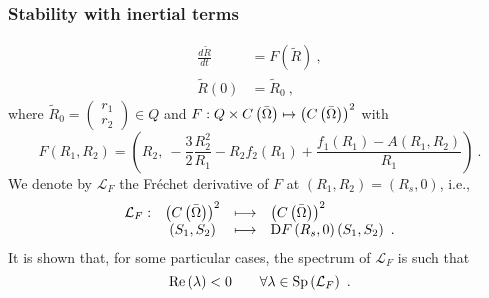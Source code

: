 \documentclass[10pt,aspectratio=169]{beamer}
\begin{document}
\begin{frame}
\frametitle{Stability with inertial terms}
\vspace*{0.5cm}
\begin{equation}
\begin{split}
\frac{d\tilde{R}}{dt}&=F(\tilde{R})~,\\
\tilde{R}(0)&=\tilde{R}_0~,
\end{split}
\end{equation}
where $\tilde{R}_0=\begin{pmatrix}
{r}_1\\ {r}_2
\end{pmatrix}\in Q$ and $F:Q\times C\left(\bar{\Omega}\right)\mapsto \left(C\left(\bar{\Omega}\right)\right)^2$ with
\begin{equation}
F(R_1,R_2)=\left(
R_2,~-\frac{3}{2}\frac{R_2^2}{R_1}-R_2f_2\left(R_1\right)+\frac{f_1\left(R_1\right)-A\left(R_1,R_2\right)}{R_1}\right)~.
\end{equation}
We denote by $\mathcal{L}_F$ the Fréchet derivative of $F$ at $\left(R_1,R_2\right)=\left(R_s,0\right)$, i.e.,
\begin{equation}
\begin{array}{cccl}
\mathcal{L}_F:&\left(C\left(\bar{\Omega}\right)\right)^2&\longmapsto& \left(C\left(\bar{\Omega}\right)\right)^2\\
&(S_1,S_2)& \longmapsto & \textnormal{D}F\left(R_s,0\right)\left(S_1,S_2\right)~.\label{eq:jacobian_inertia}
\end{array}
\end{equation} 
It is shown that, for some particular cases, the spectrum of $\mathcal{L}_F$ is such that $$\mbox{Re}\left(\lambda\right)<0\qquad \forall \lambda\in \textnormal{Sp}\left(\mathcal{L}_F\right)~.$$
\end{frame}



\end{document}
